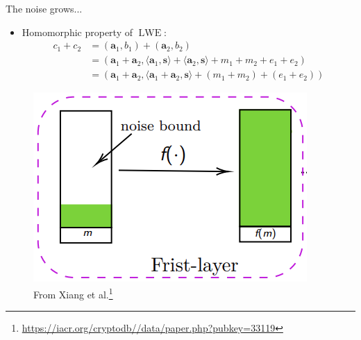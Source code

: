 \documentclass[aspectratio=169]{beamer}
\begin{document}
\begin{frame}{The noise grows...}
    \begin{itemize}
        \item Homomorphic property of $\operatorname{LWE}$:
    \begin{align*}
                c_1 + c_2 &= (\mathbf{a}_1, b_1) + (\mathbf{a}_2, b_2) \\
                &= (\mathbf{a}_1 + \mathbf{a}_2, \langle \mathbf{a}_1, \mathbf{s} \rangle + \langle \mathbf{a}_2, \mathbf{s} \rangle + m_1 + m_2 + e_1 + e_2 ) \\
                &= (\mathbf{a}_1 + \mathbf{a}_2, \langle \mathbf{a}_1 + \mathbf{a}_2, \mathbf{s} \rangle + (m_1 + m_2) + (e_1 + e_2))
            \end{align*}
    \end{itemize}

    \begin{figure}
        \centering
        \includegraphics[scale=0.3]{data/noise.png}
        \caption{From Xiang et al.\footnote[frame]{\label{xzddf_slides} \url{https://iacr.org/cryptodb//data/paper.php?pubkey=33119}}}
        \label{fig:noise}
    \end{figure}
\end{frame}
\end{document}
